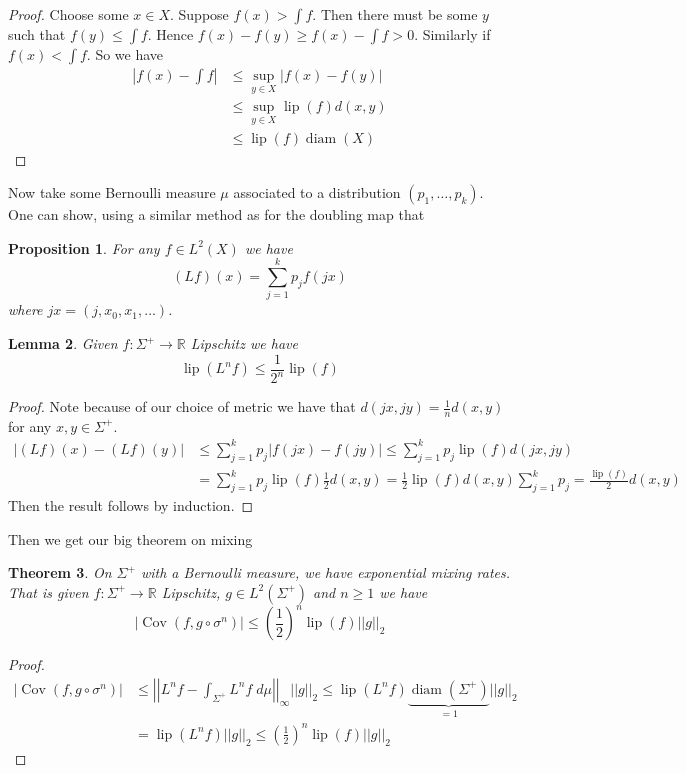\documentclass[11pt]{article}
\newcommand{\abs}[1]{\left|#1\right|}
\newcommand{\norm}[1]{\left|\left|#1\right|\right|}
\newcommand{\R}{\mathbb{R}}
\DeclareMathOperator{\Cov}{\mathrm{Cov}}
\DeclareMathOperator{\lip}{\mathrm{lip}}
\DeclareMathOperator{\diam}{\mathrm{diam}}
\newcommand{\dm}{\;d\mu}
\newtheorem{prop}{Proposition}[section]
\newtheorem{theorem}[prop]{Theorem}
\newtheorem{lemma}[prop]{Lemma}
\begin{document}
\begin{proof}
Choose some $x\in X$.
Suppose $f(x) > \int f$.
Then there must be some $y$ such that $f(y) \leq \int f$.
Hence $f(x) - f(y) \geq f(x) - \int f > 0$.
Similarly if $f(x) < \int f$.
So we have
\begin{align*}
	\abs{f(x) - \int f} & \leq \sup_{y\in X} \abs{f(x) - f(y)} \\
						& \leq \sup_{y\in X} \lip(f) d(x, y) \\
						& \leq \lip(f) \diam(X)
\end{align*}
\end{proof}

Now take some Bernoulli measure $\mu$ associated to a distribution $(p_1, \dots , p_k)$.
One can show, using a similar method as for the doubling map that
\begin{prop}
For any $f\in L^2(X)$ we have
\[
	(Lf)(x)= \sum_{j=1}^{k}p_j f(jx)
\]
where $jx = (j, x_0, x_1, \dots )$.
\end{prop}

\begin{lemma}
Given $f:\Sigma^+ \to \R$ Lipschitz we have
\[
	\lip(L^n f) \leq \frac{1}{2^n}\lip(f)
\]
\end{lemma}

\begin{proof}
Note because of our choice of metric we have that $d(jx, jy) = \frac{1}{n}d(x, y)$ for any $x, y\in\Sigma^+$.
\begin{align*}
	\abs{(Lf)(x)-(Lf)(y)} & \leq \sum_{j=1}^{k}p_j \abs{f(jx) - f(jy)} \leq \sum_{j=1}^{k} p_j \lip(f) d(jx, jy) \\
						  & = \sum_{j=1}^{k} p_j \lip(f) \frac{1}{2}d(x, y) = \frac{1}{2}\lip(f) d(x, y) \sum_{j=1}^{k}p_j = \frac{\lip(f)}{2}d(x,y)
\end{align*}
Then the result follows by induction.
\end{proof}

Then we get our big theorem on mixing

\begin{theorem}
On $\Sigma^+$ with a Bernoulli measure, we have exponential mixing rates.
That is given $f:\Sigma^+ \to \R$ Lipschitz, $g\in L^2(\Sigma^+)$ and $n\geq 1$ we have
\[
	\abs{\Cov(f, g \circ \sigma^n)} \leq \left( \frac{1}{2}\right)^n \lip(f) \norm{g}_2
\]
\end{theorem}

\begin{proof}
\begin{align*}
	\abs{\Cov(f, g \circ \sigma^n)} &\leq \norm{L^nf - \int_{\Sigma^+}L^nf \dm}_\infty \norm{g}_2 \leq \lip(L^nf)\underbrace{\diam(\Sigma^+)}_{=1}\norm{g}_2 \\
									&= \lip(L^n f) \norm{g}_2 \leq \left( \frac{1}{2}\right)^n\lip(f) \norm{g}_2
\end{align*}
\end{proof}
\end{document}
